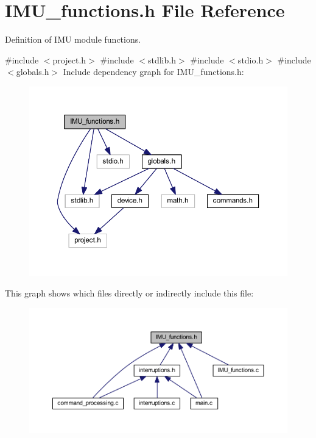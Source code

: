 \section{I\+M\+U\+\_\+functions.\+h File Reference}
\label{_i_m_u__functions_8h}


Definition of I\+MU module functions.  


{\ttfamily \#include $<$project.\+h$>$}\newline
{\ttfamily \#include $<$stdlib.\+h$>$}\newline
{\ttfamily \#include $<$stdio.\+h$>$}\newline
{\ttfamily \#include $<$globals.\+h$>$}\newline
Include dependency graph for I\+M\+U\+\_\+functions.\+h\+:
\nopagebreak
\begin{figure}[H]
\begin{center}
\leavevmode
\includegraphics[width=350pt]{_i_m_u__functions_8h__incl}
\end{center}
\end{figure}
This graph shows which files directly or indirectly include this file\+:
\nopagebreak
\begin{figure}[H]
\begin{center}
\leavevmode
\includegraphics[width=350pt]{_i_m_u__functions_8h__dep__incl}
\end{center}
\end{figure}
